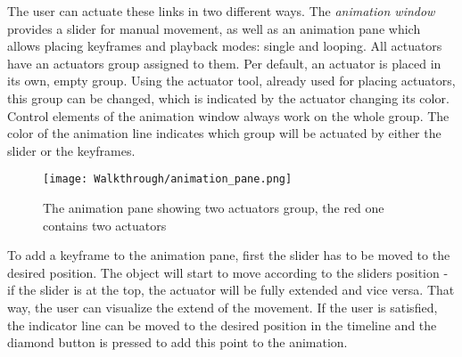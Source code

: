 The user can actuate these links in two different ways. The \textit{animation window} provides a slider for manual movement, as well as an animation pane which allows placing keyframes and playback modes: single and looping. All actuators have an actuators group assigned to them. Per default, an actuator is placed in its own, empty group. Using the actuator tool, already used for placing actuators, this group can be changed, which is indicated by the actuator changing its color.\\
Control elements of the animation window always work on the whole group. The color of the animation line indicates which group will be actuated by either the slider or the keyframes.
\begin{figure}[h!]
    \texttt{[image: Walkthrough/animation\_pane.png]}
    \centering
    \caption{The animation pane showing two actuators group, the red one contains two actuators}
    \label{fig:animation_pane}
\end{figure}
To add a keyframe to the animation pane, first the slider has to be moved to the desired position. The object will start to move according to the sliders position - if the slider is at the top, the actuator will be fully extended and vice versa. That way, the user can visualize the extend of the movement. If the user is satisfied, the indicator line can be moved to the desired position in the timeline and the diamond button is pressed to add this point to the animation.

